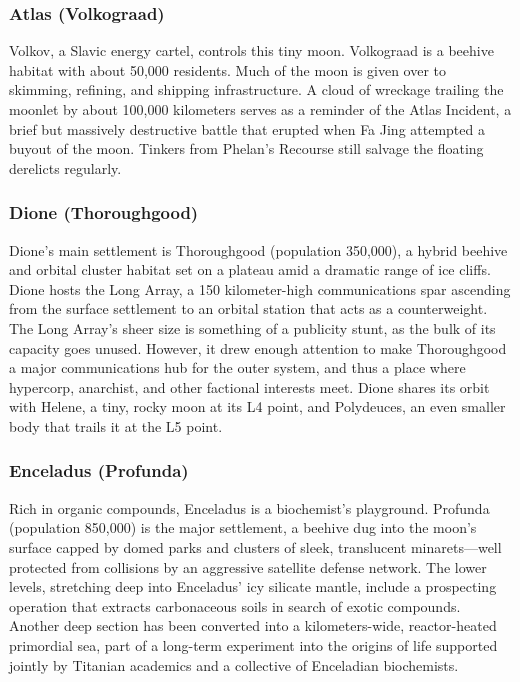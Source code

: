 \subsubsection{Atlas (Volkograad)} \label{sec:atlas-volkograad} 

Volkov, a Slavic energy cartel, controls this tiny moon. Volkograad is a beehive habitat with about 50,000 residents. Much of the moon is given over to skimming, refining, and shipping infrastructure. A cloud of wreckage trailing the moonlet by about 100,000 kilometers serves as a reminder of the Atlas Incident, a brief but massively destructive battle that erupted when Fa Jing attempted a buyout of the moon. Tinkers from Phelan’s Recourse still salvage the floating derelicts regularly. 

\subsubsection{Dione (Thoroughgood)} \label{sec:dione-thoroughgood} 

Dione’s main settlement is Thoroughgood (population 350,000), a hybrid beehive and orbital cluster habitat set on a plateau amid a dramatic range of ice cliffs. Dione hosts the Long Array, a 150 kilometer-high communications spar ascending from the surface settlement to an orbital station that acts as a counterweight. The Long Array’s sheer size is something of a publicity stunt, as the bulk of its capacity goes unused. However, it drew enough attention to make Thoroughgood a major communications hub for the outer system, and thus a place where hypercorp, anarchist, and other factional interests meet. Dione shares its orbit with Helene, a tiny, rocky moon at its L4 point, and Polydeuces, an even smaller body that trails it at the L5 point. 

\subsubsection{Enceladus (Profunda)} \label{sec:enceladus-profunda} 

Rich in organic compounds, Enceladus is a biochemist’s playground. Profunda (population 850,000) is the major settlement, a beehive dug into the moon’s surface capped by domed parks and clusters of sleek, translucent minarets—well protected from collisions by an aggressive satellite defense network. The lower levels, stretching deep into Enceladus’ icy silicate mantle, include a prospecting operation that extracts carbonaceous soils in search of exotic compounds. Another deep section has been converted into a kilometers-wide, reactor-heated primordial sea, part of a long-term experiment into the origins of life supported jointly by Titanian academics and a collective of Enceladian biochemists. 

